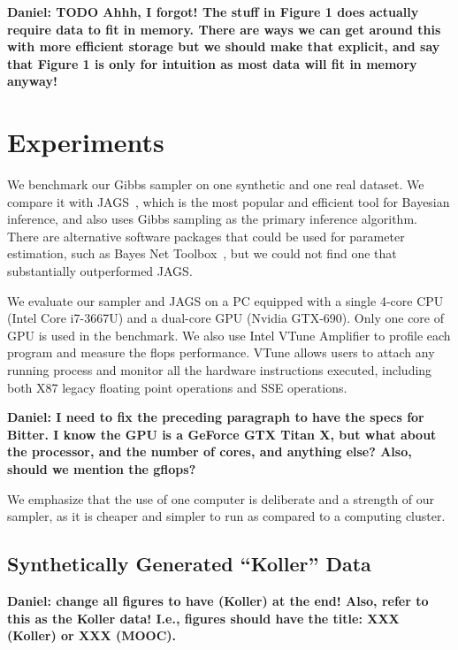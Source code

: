 \documentclass{article} %
\begin{document}
\textbf{Daniel: TODO Ahhh, I forgot! The stuff in Figure 1 does actually require data to fit in
memory. There are ways we can get around this with more efficient storage but we should make that
explicit, and say that Figure 1 is only for intuition as most data will fit in memory anyway!}




\section{Experiments}\label{sec:experiments}

We benchmark our Gibbs sampler on one synthetic and one real dataset. We compare it with
JAGS~\citep{JAGS2003}, which is the most popular and efficient tool for Bayesian inference, and also
uses Gibbs sampling as the primary inference algorithm. There are alternative software packages that
could be used for parameter estimation, such as Bayes Net Toolbox~\citep{bnt2001}, but we could not
find one that substantially outperformed JAGS.

We evaluate our sampler and JAGS on a PC equipped with a single 4-core CPU (Intel Core i7-3667U)
and a dual-core GPU (Nvidia GTX-690). Only one core of GPU is used in the benchmark. We also use
Intel VTune Amplifier to profile each program and measure the flops performance. VTune allows users
to attach any running process and monitor all the hardware instructions executed, including both X87
legacy floating point operations and SSE operations.

\textbf{Daniel: I need to fix the preceding paragraph to have the specs for Bitter. I know the GPU
is a GeForce GTX Titan X, but what about the processor, and the number of cores, and anything else?
Also, should we mention the gflops?}

We emphasize that the use of one computer is deliberate and a strength of our sampler, as it is
cheaper and simpler to run as compared to a computing cluster.


\subsection{Synthetically Generated ``Koller'' Data}\label{ssec:student_data}

\textbf{Daniel: change all figures to have (Koller) at the end! Also, refer to this as the Koller
data! I.e., figures should have the title: XXX (Koller) or XXX (MOOC).}
\end{document}
